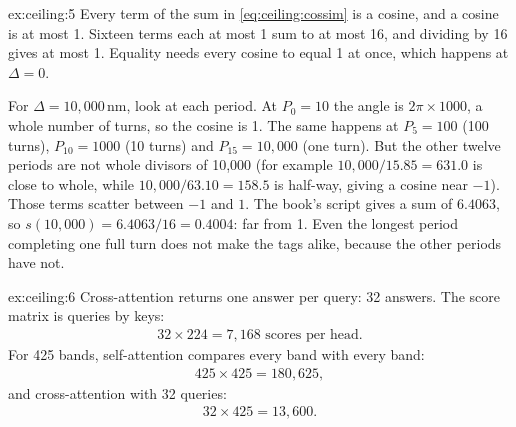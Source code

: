 \begin{solution}{ex:ceiling:5}
Every term of the sum in \cref{eq:ceiling:cossim} is a cosine, and a cosine is at most 1. Sixteen terms each at most 1 sum to at most 16, and dividing by 16 gives at most 1. Equality needs every cosine to equal 1 at once, which happens at $\Delta = 0$.

For $\Delta = 10{,}000$\,nm, look at each period. At $P_0 = 10$ the angle is $2\pi\times1000$, a whole number of turns, so the cosine is 1. The same happens at $P_5 = 100$ (100 turns), $P_{10} = 1000$ (10 turns) and $P_{15} = 10{,}000$ (one turn). But the other twelve periods are not whole divisors of 10,000 (for example $10{,}000/15.85 = 631.0$ is close to whole, while $10{,}000/63.10 = 158.5$ is half-way, giving a cosine near $-1$). Those terms scatter between $-1$ and $1$. The book's script gives a sum of $6.4063$, so $s(10{,}000) = 6.4063/16 = 0.4004$: far from 1. Even the longest period completing one full turn does not make the tags alike, because the other periods have not.
\end{solution}

\begin{solution}{ex:ceiling:6}
Cross-attention returns one answer per query: 32 answers. The score matrix is queries by keys:
\begin{align*}
  32\times224 = 7{,}168 \text{ scores per head}.
\end{align*}
For 425 bands, self-attention compares every band with every band:
\begin{align*}
  425\times425 = 180{,}625,
\end{align*}
and cross-attention with 32 queries:
\begin{align*}
  32\times425 = 13{,}600 .
\end{align*}
\end{solution}

